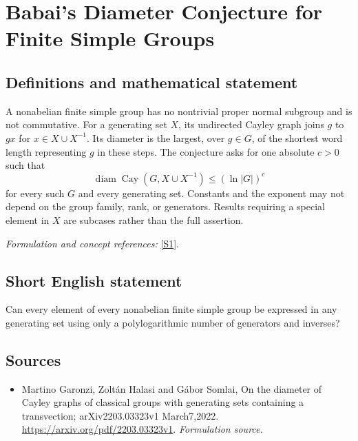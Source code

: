 \documentclass[11pt]{article}
\begin{document}
\section*{\texorpdfstring{Babai's Diameter Conjecture for Finite Simple Groups}{Babai's Diameter Conjecture for Finite Simple Groups}}\label{30000952}
\subsection{Definitions and mathematical statement}
A nonabelian finite simple group has no nontrivial proper normal subgroup and is not commutative. For a generating set $X$, its undirected Cayley graph joins $g$ to $gx$ for $x\in X\cup X^{-1}$. Its diameter is the largest, over $g\in G$, of the shortest word length representing $g$ in these steps. The conjecture asks for one absolute $c>0$ such that
\[
 \operatorname{diam}\operatorname{Cay}(G,X\cup X^{-1})\le(\ln|G|)^c
\]
for every such $G$ and every generating set. Constants and the exponent may not depend on the group family, rank, or generators. Results requiring a special element in $X$ are subcases rather than the full assertion.
\par\smallskip\textit{Formulation and concept references:} \href{https://arxiv.org/pdf/2203.03323v1}{[S1]}.

\subsection{Short English statement}
Can every element of every nonabelian finite simple group be expressed in any generating set using only a polylogarithmic number of generators and inverses?
\subsection{Sources}
\begin{itemize}
\item[S1]Martino Garonzi, Zoltán Halasi and Gábor Somlai, On the diameter of Cayley graphs of classical groups with generating sets containing a transvection; arXiv2203.03323v1 March7,2022.
\url{https://arxiv.org/pdf/2203.03323v1}.
\textit{Formulation source.}
\end{itemize}
\end{document}
